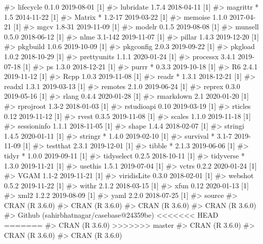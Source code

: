 \documentclass[
]{jss}
\begin{document}
\begin{CodeChunk}
\begin{CodeInput}
\begin{CodeChunk}
\begin{CodeOutput}
#>  lifecycle     0.1.0      2019-08-01 [1]
#>  lubridate     1.7.4      2018-04-11 [1]
#>  magrittr    * 1.5        2014-11-22 [1]
#>  Matrix      * 1.2-17     2019-03-22 [1]
#>  memoise       1.1.0      2017-04-21 [1]
#>  mgcv          1.8-31     2019-11-09 [1]
#>  modelr        0.1.5      2019-08-08 [1]
#>  munsell       0.5.0      2018-06-12 [1]
#>  nlme          3.1-142    2019-11-07 [1]
#>  pillar        1.4.3      2019-12-20 [1]
#>  pkgbuild      1.0.6      2019-10-09 [1]
#>  pkgconfig     2.0.3      2019-09-22 [1]
#>  pkgload       1.0.2      2018-10-29 [1]
#>  prettyunits   1.1.1      2020-01-24 [1]
#>  processx      3.4.1      2019-07-18 [1]
#>  ps            1.3.0      2018-12-21 [1]
#>  purrr       * 0.3.3      2019-10-18 [1]
#>  R6            2.4.1      2019-11-12 [1]
#>  Rcpp          1.0.3      2019-11-08 [1]
#>  readr       * 1.3.1      2018-12-21 [1]
#>  readxl        1.3.1      2019-03-13 [1]
#>  remotes       2.1.0      2019-06-24 [1]
#>  reprex        0.3.0      2019-05-16 [1]
#>  rlang         0.4.4      2020-01-28 [1]
#>  rmarkdown     2.1        2020-01-20 [1]
#>  rprojroot     1.3-2      2018-01-03 [1]
#>  rstudioapi    0.10       2019-03-19 [1]
#>  rticles       0.12       2019-11-12 [1]
#>  rvest         0.3.5      2019-11-08 [1]
#>  scales        1.1.0      2019-11-18 [1]
#>  sessioninfo   1.1.1      2018-11-05 [1]
#>  shape         1.4.4      2018-02-07 [1]
#>  stringi       1.4.5      2020-01-11 [1]
#>  stringr     * 1.4.0      2019-02-10 [1]
#>  survival    * 3.1-7      2019-11-09 [1]
#>  testthat      2.3.1      2019-12-01 [1]
#>  tibble      * 2.1.3      2019-06-06 [1]
#>  tidyr       * 1.0.0      2019-09-11 [1]
#>  tidyselect    0.2.5      2018-10-11 [1]
#>  tidyverse   * 1.3.0      2019-11-21 [1]
#>  usethis       1.5.1      2019-07-04 [1]
#>  vctrs         0.2.2      2020-01-24 [1]
#>  VGAM          1.1-2      2019-11-21 [1]
#>  viridisLite   0.3.0      2018-02-01 [1]
#>  webshot       0.5.2      2019-11-22 [1]
#>  withr         2.1.2      2018-03-15 [1]
#>  xfun          0.12       2020-01-13 [1]
#>  xml2          1.2.2      2019-08-09 [1]
#>  yaml          2.2.0      2018-07-25 [1]
#>  source                                  
#>  CRAN (R 3.6.0)                          
#>  CRAN (R 3.6.0)                          
#>  CRAN (R 3.6.0)                          
#>  CRAN (R 3.6.0)                          
#>  Github (sahirbhatnagar/casebase@24359be)
<<<<<<< HEAD
=======
#>  CRAN (R 3.6.0)                          
>>>>>>> master
#>  CRAN (R 3.6.0)                          
#>  CRAN (R 3.6.0)                          
#>  CRAN (R 3.6.0)                          

\end{CodeOutput}
\end{CodeChunk}
\end{CodeInput}
\end{CodeChunk}
\end{document}
